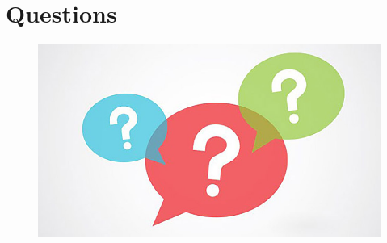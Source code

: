 \documentclass[aspectratio=169]{beamer} %
\begin{document}
	\section{Questions}
	\begin{frame}
		\begin{figure}
			\centering
			\includegraphics[width=.9\textwidth]{Img/question.jpg}
		\end{figure}
	\end{frame}
\end{document}
